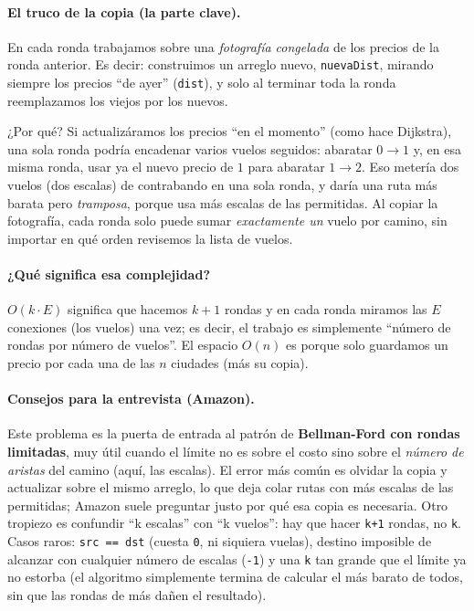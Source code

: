 \paragraph{El truco de la copia (la parte clave).} En cada ronda trabajamos
sobre una \emph{fotografía congelada} de los precios de la ronda anterior. Es
decir: construimos un arreglo nuevo, \texttt{nuevaDist}, mirando siempre los
precios ``de ayer'' (\texttt{dist}), y solo al terminar toda la ronda
reemplazamos los viejos por los nuevos.

¿Por qué? Si actualizáramos los precios ``en el momento'' (como hace
Dijkstra), una sola ronda podría encadenar varios vuelos seguidos: abaratar
$0\to1$ y, en esa misma ronda, usar ya el nuevo precio de $1$ para abaratar
$1\to2$. Eso metería dos vuelos (dos escalas) de contrabando en una sola
ronda, y daría una ruta más barata pero \emph{tramposa}, porque usa más
escalas de las permitidas. Al copiar la fotografía, cada ronda solo puede
sumar \emph{exactamente un} vuelo por camino, sin importar en qué orden
revisemos la lista de vuelos.




\paragraph{¿Qué significa esa complejidad?} $O(k\cdot E)$ significa que
hacemos $k+1$ rondas y en cada ronda miramos las $E$ conexiones (los vuelos)
una vez; es decir, el trabajo es simplemente ``número de rondas por número de
vuelos''. El espacio $O(n)$ es porque solo guardamos un precio por cada una
de las $n$ ciudades (más su copia).

\paragraph{Consejos para la entrevista (Amazon).} Este problema es la puerta
de entrada al patrón de \textbf{Bellman-Ford con rondas limitadas}, muy útil
cuando el límite no es sobre el costo sino sobre el \emph{número de aristas}
del camino (aquí, las escalas). El error más común es olvidar la copia y
actualizar sobre el mismo arreglo, lo que deja colar rutas con más escalas de
las permitidas; Amazon suele preguntar justo por qué esa copia es necesaria.
Otro tropiezo es confundir ``k escalas'' con ``k vuelos'': hay que hacer
\texttt{k+1} rondas, no \texttt{k}. Casos raros: \texttt{src == dst} (cuesta
\texttt{0}, ni siquiera vuelas), destino imposible de alcanzar con cualquier
número de escalas (\texttt{-1}) y una \texttt{k} tan grande que el límite ya
no estorba (el algoritmo simplemente termina de calcular el más barato de
todos, sin que las rondas de más dañen el resultado).
